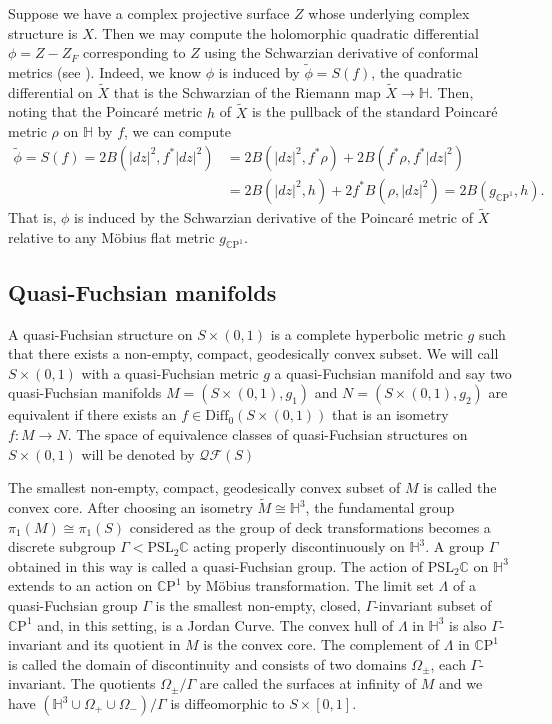 \documentclass{amsart}
\newcommand{\C}{\mathbb{C}}
\newcommand{\CP}{\mathbb{C}\mathrm{P}}
\renewcommand{\H}{\mathbb{H}}
\begin{document}
Suppose we have a complex projective surface $Z$ whose underlying complex structure is $X$. 
Then we may compute the holomorphic quadratic differential $\phi = Z - Z_F$ corresponding to $Z$ using the Schwarzian derivative of conformal metrics (see \cite{dumas2007}). 
Indeed, we know $\phi$ is induced by $\tilde{\phi} = S(f)$, the quadratic differential on $\tilde{X}$ that is the Schwarzian of the Riemann map $\tilde{X} \to \H$. 
Then, noting that the Poincar\'e metric $h$ of $\tilde{X}$ is the pullback of the standard Poincar\'e metric $\rho$ on $\H$ by $f$, we can compute
\begin{align*}
\tilde{\phi}
= S(f)
= 2B(|dz|^2,f^*|dz|^2)
&= 2B(|dz|^2,f^*\rho) + 2B(f^*\rho,f^*|dz|^2) \\
&= 2B(|dz|^2,h) + 2f^*B(\rho,|dz|^2)
= 2B(g_{\CP^1},h).
\end{align*}
That is, $\phi$ is induced by the Schwarzian derivative of the Poincar\'e metric of $\tilde{X}$ relative to any M\"obius flat metric $g_{\CP^1}$.



\subsection{Quasi-Fuchsian manifolds} \label{quasi-fuchsian}



A quasi-Fuchsian structure on $S \times (0,1)$ is a complete hyperbolic metric $g$ such that there exists a non-empty, compact, geodesically convex subset. 
We will call $S \times (0,1)$ with a quasi-Fuchsian metric $g$ a quasi-Fuchsian manifold and say two quasi-Fuchsian manifolds $M = (S \times (0,1), g_1)$ and $N = (S \times (0,1), g_2)$ are equivalent if there exists an $f \in \mathrm{Diff}_0(S \times(0,1))$ that is an isometry $f: M \to N$.
The space of equivalence classes of quasi-Fuchsian structures on $S \times (0,1)$ will be denoted by $\mathcal{QF}(S)$

The smallest non-empty, compact, geodesically convex subset of $M$ is called the convex core. 
After choosing an isometry $\tilde{M} \cong \H^3$, the fundamental group $\pi_1(M) \cong \pi_1(S)$ considered as the group of deck transformations becomes a discrete subgroup $\Gamma < \mathrm{PSL}_2\C$ acting properly discontinuously on $\H^3$. 
A group $\Gamma$ obtained in this way is called a quasi-Fuchsian group.
The action of $\mathrm{PSL}_2\C$ on $\H^3$ extends to an action on $\CP^1$ by M\"obius transformation. 
The limit set $\Lambda$ of a quasi-Fuchsian group $\Gamma$ is the smallest non-empty, closed, $\Gamma$-invariant subset of $\CP^1$ and, in this setting, is a Jordan Curve. 
The convex hull of $\Lambda$ in $\H^3$ is also $\Gamma$-invariant and its quotient in $M$ is the convex core. 
The complement of $\Lambda$ in $\CP^1$ is called the domain of discontinuity and consists of two domains $\Omega_\pm$, each $\Gamma$-invariant. 
The quotients $\Omega_\pm /\Gamma$ are called the surfaces at infinity of $M$ and we have $(\H^3 \cup \Omega_+ \cup \Omega_-)/\Gamma$ is diffeomorphic to $S \times [0,1]$.
\end{document}
